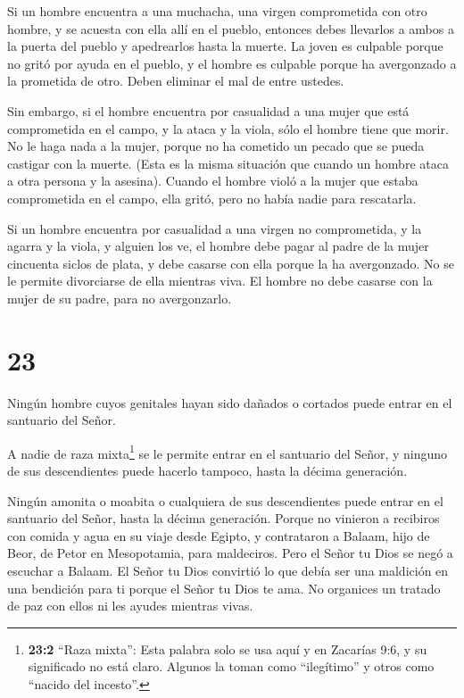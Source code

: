  Si un hombre encuentra a una muchacha, una virgen
comprometida con otro hombre, y se acuesta con ella allí en el pueblo,
 entonces debes llevarlos a ambos a la puerta del pueblo y
apedrearlos hasta la muerte. La joven es culpable porque no gritó por
ayuda en el pueblo, y el hombre es culpable porque ha avergonzado a la
prometida de otro. Deben eliminar el mal de entre ustedes.

 Sin embargo, si el hombre encuentra por casualidad a una
mujer que está comprometida en el campo, y la ataca y la viola, sólo el
hombre tiene que morir.  No le haga nada a la mujer, porque
no ha cometido un pecado que se pueda castigar con la muerte. (Esta es
la misma situación que cuando un hombre ataca a otra persona y la
asesina).  Cuando el hombre violó a la mujer que estaba
comprometida en el campo, ella gritó, pero no había nadie para
rescatarla.

 Si un hombre encuentra por casualidad a una virgen no
comprometida, y la agarra y la viola, y alguien los ve,  el
hombre debe pagar al padre de la mujer cincuenta siclos de plata, y debe
casarse con ella porque la ha avergonzado. No se le permite divorciarse
de ella mientras viva.  El hombre no debe casarse con la
mujer de su padre, para no avergonzarlo.

\hypertarget{section-22}{%
\section{23}\label{section-22}}

 Ningún hombre cuyos genitales hayan sido dañados o cortados
puede entrar en el santuario del Señor.

 A nadie de raza mixta\footnote{\textbf{23:2} ``Raza
  mixta'': Esta palabra solo se usa aquí y en Zacarías 9:6, y su
  significado no está claro. Algunos la toman como ``ilegítimo'' y otros
  como ``nacido del incesto''.} se le permite entrar en el santuario del
Señor, y ninguno de sus descendientes puede hacerlo tampoco, hasta la
décima generación.

 Ningún amonita o moabita o cualquiera de sus descendientes
puede entrar en el santuario del Señor, hasta la décima generación.
 Porque no vinieron a recibiros con comida y agua en su
viaje desde Egipto, y contrataron a Balaam, hijo de Beor, de Petor en
Mesopotamia, para maldeciros.  Pero el Señor tu Dios se negó
a escuchar a Balaam. El Señor tu Dios convirtió lo que debía ser una
maldición en una bendición para ti porque el Señor tu Dios te ama.
 No organices un tratado de paz con ellos ni les ayudes
mientras vivas.

